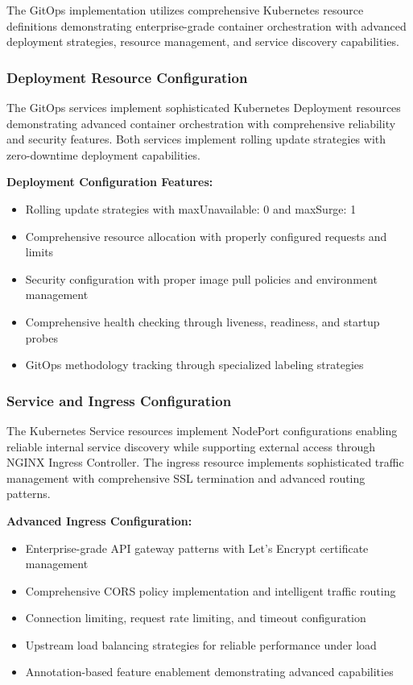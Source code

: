 The GitOps implementation utilizes comprehensive Kubernetes resource definitions demonstrating enterprise-grade container orchestration with advanced deployment strategies, resource management, and service discovery capabilities.

\subsubsection{Deployment Resource Configuration}

The GitOps services implement sophisticated Kubernetes Deployment resources demonstrating advanced container orchestration with comprehensive reliability and security features. Both services implement rolling update strategies with zero-downtime deployment capabilities.

\textbf{Deployment Configuration Features:}
\begin{itemize}
\item Rolling update strategies with maxUnavailable: 0 and maxSurge: 1
\item Comprehensive resource allocation with properly configured requests and limits
\item Security configuration with proper image pull policies and environment management
\item Comprehensive health checking through liveness, readiness, and startup probes
\item GitOps methodology tracking through specialized labeling strategies
\end{itemize}

\subsubsection{Service and Ingress Configuration}

The Kubernetes Service resources implement NodePort configurations enabling reliable internal service discovery while supporting external access through NGINX Ingress Controller. The ingress resource implements sophisticated traffic management with comprehensive SSL termination and advanced routing patterns.

\textbf{Advanced Ingress Configuration:}
\begin{itemize}
\item Enterprise-grade API gateway patterns with Let's Encrypt certificate management
\item Comprehensive CORS policy implementation and intelligent traffic routing
\item Connection limiting, request rate limiting, and timeout configuration
\item Upstream load balancing strategies for reliable performance under load
\item Annotation-based feature enablement demonstrating advanced capabilities
\end{itemize}

